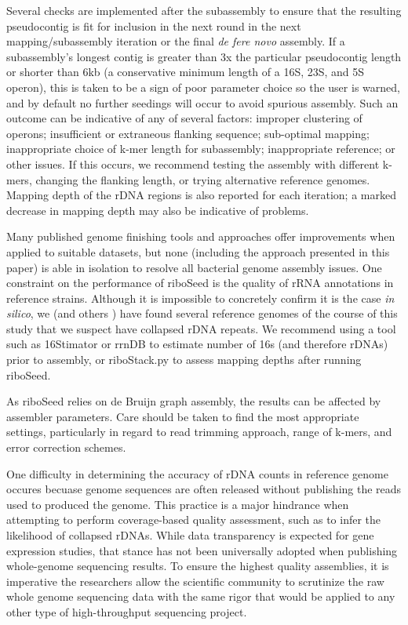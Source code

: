 \documentclass[a4,center,fleqn]{NAR}
\begin{document}
Several checks are implemented after the subassembly to ensure that the resulting pseudocontig is fit for inclusion in the next round in the next mapping/subassembly iteration or the final \textit{de fere novo} assembly. If a subassembly's longest contig is greater than 3x the particular pseudocontig length or shorter than 6kb (a conservative minimum length of a 16S, 23S, and 5S operon), this is taken to be a sign of poor parameter choice so the user is warned, and by default no further seedings will occur to avoid spurious assembly. Such an outcome can be indicative of any of several factors: improper clustering of operons; insufficient or extraneous flanking sequence; sub-optimal mapping; inappropriate choice of k-mer length for subassembly; inappropriate reference; or other issues. If this occurs, we recommend testing the assembly with different k-mers, changing the flanking length, or trying alternative reference genomes. Mapping depth of the rDNA regions is also reported for each iteration; a marked decrease in mapping depth may also be indicative of problems.


Many published genome finishing tools and approaches offer improvements when applied to suitable datasets, but none (including the approach presented in this paper) is able in isolation to resolve all bacterial genome assembly issues. One constraint on the performance of riboSeed is the quality of rRNA annotations in reference strains. Although it is impossible to concretely confirm it is the case \textit{in silico}, we (and others \cite{Mariano2016}) have found several reference genomes of the course of this study that we suspect have collapsed rDNA repeats. We recommend using a tool such as 16Stimator\cite{Perisin2016} or rrnDB\cite{Stoddard2014} to estimate number of 16s (and therefore rDNAs) prior to assembly, or riboStack.py to assess mapping depths after running riboSeed.

As riboSeed relies on de Bruijn graph assembly, the results can be affected by assembler parameters. Care should be taken to find the most appropriate settings, particularly in regard to read trimming approach, range of k-mers, and error correction schemes.

One difficulty in determining the accuracy of rDNA counts in reference genome occures becuase genome sequences are often released without publishing the reads used to produced the genome. This practice is a major hindrance when attempting to perform coverage-based quality assessment, such as to infer the likelihood of collapsed rDNAs. While data transparency is expected for gene expression studies, that stance has not been universally adopted when publishing whole-genome sequencing results. To ensure the highest quality assemblies, it is imperative the researchers allow the scientific community to scrutinize the raw whole genome sequencing data with the same rigor that would be applied to any other type of high-throughput sequencing project.
\end{document}
